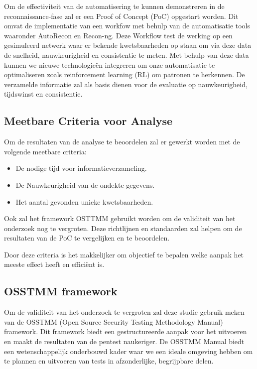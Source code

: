 Om de effectiviteit van de automatisering te kunnen demonstreren in de reconnaissance-fase zal er een Proof of Concept (PoC) opgestart worden.
Dit omvat de implementatie van een workfow met behulp van de automatisatie tools waaronder AutoRecon en Recon-ng. Deze
Workflow test de werking op een gesimuleerd netwerk waar er bekende kwetsbaarheden op staan om via deze data de snelheid,
nauwkeurigheid en consistentie te meten. Met behulp van deze data kunnen we nieuwe technologieën integreren om onze automatisatie te optimaliseren
zoals reinforcement learning (RL) om patronen te herkennen.
De verzamelde informatie zal als basis dienen voor de evaluatie op nauwkeurigheid, tijdswinst en consistentie.


\newpage
\subsection{Meetbare Criteria voor Analyse}

Om de resultaten van de analyse te beoordelen zal er gewerkt worden met de volgende meetbare criteria:
\begin{itemize}
    \item De nodige tijd voor informatieverzameling.
    \item De Nauwkeurigheid van de ondekte gegevens.
    \item Het aantal gevonden unieke kwetsbaarheden.
\end{itemize}

Ook zal het framework OSTTMM gebruikt worden om de validiteit van het onderzoek nog te vergroten.
Deze richtlijnen en standaarden zal helpen om de resultaten van de PoC te vergelijken en te beoordelen.

Door deze criteria is het makkelijker om objectief te bepalen welke aanpak het meeste effect heeft en efficiënt is.

\subsection{OSSTMM framework}

Om de validiteit van het onderzoek te vergroten zal deze studie gebruik meken van de OSSTMM (Open Source Security Testing Methodology Manual) framework. 
Dit framework biedt een gestructureerde aanpak voor het uitvoeren en maakt de resultaten van de pentest naukeriger. 
De OSSTMM Manual biedt een wetenschappelijk onderbouwd kader waar we een ideale omgeving hebben om te plannen en uitvoeren van tests in afzonderlijke, begrijpbare delen.

